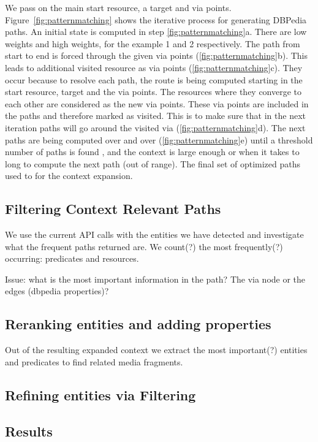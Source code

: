 \documentclass{acm_proc_article-sp}
\begin{document}
We pass on the main start resource, a target and via points. Figure~\ref{fig:patternmatching} shows the iterative process for generating DBPedia paths. An initial state is computed in step \ref{fig:patternmatching}a. There are low weights and high weights, for the example 1 and 2 respectively. The path from start to end is forced through the given via points (\ref{fig:patternmatching}b). This leads to additional visited resource as via points (\ref{fig:patternmatching}c). They occur because to resolve each path, the route is being computed starting in the start resource, target and the via points. The resources where they converge to each other are considered as the new via points. These via points are included in the paths and therefore marked as visited. This is to make sure that in the next iteration paths will go around the visited via (\ref{fig:patternmatching}d). The next paths are being computed over and over (\ref{fig:patternmatching}e) until a threshold number of paths is found , and the context is large enough or when it takes to long to compute the next path (out of range). The final set of optimized paths used to for the context expansion.

\subsection{Filtering Context Relevant Paths}

We use the current API calls with the entities we have detected and investigate what the frequent paths returned are. We count(?) the most frequently(?) occurring:
predicates and resources.

Issue: what is the most important information in the path? The via node or the edges (dbpedia properties)?



\subsection{Reranking entities and adding properties}

Out of the resulting expanded context we extract the most important(?) entities and predicates to find related media fragments.


\subsection{Refining entities via Filtering}


\subsection{Results}
\end{document}
